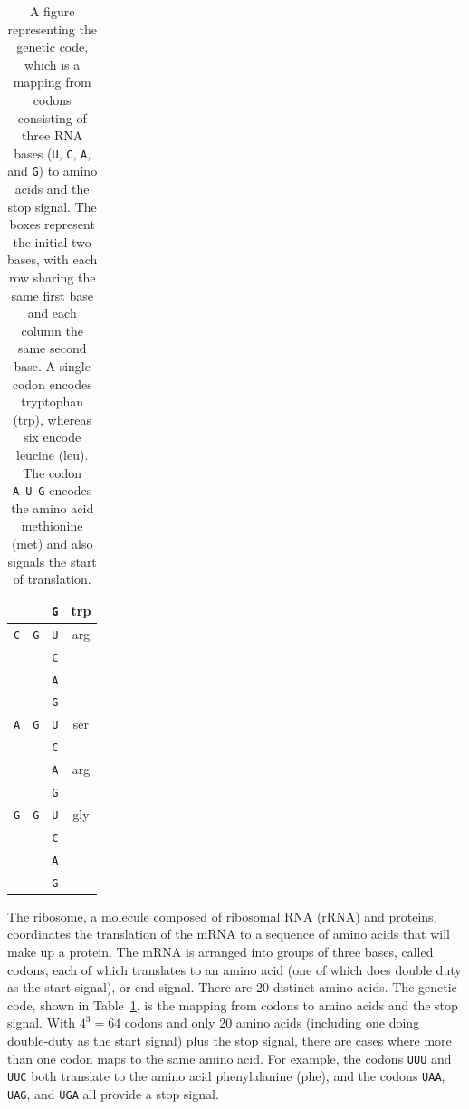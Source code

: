 \documentclass[11pt]{report}
\newcommand{\mybase}[1]{\texttt{#1}\xspace}
\newcommand{\baseA}{\mybase{A}}
\newcommand{\baseC}{\mybase{C}}
\newcommand{\baseG}{\mybase{G}}
\newcommand{\baseU}{\mybase{U}}
\newcommand{\mycaption}[2]{\caption{#2}\label{#1}}
\begin{document}
\begin{table}[t!]
\begin{tabular}{|ccc|c|}
    \\ \hline
    &  & \baseG & trp
    \\ \hline \hline
    \baseC & \baseG & \baseU & arg
    \\ & & \baseC &
    \\ & & \baseA &
    \\ & & \baseG &
    \\ \hline \hline
    \baseA & \baseG & \baseU & ser
    \\ & & \baseC &
    \\ \hline
    &  & \baseA & arg
    \\ & & \baseG &
    \\ \hline \hline
    \baseG & \baseG & \baseU & gly
    \\ & & \baseC &
    \\ & & \baseA &
    \\ & & \baseG &
    \\ \hline
  \end{tabular}
  \mycaption{tab:genetic-code}{A figure representing the genetic code,
    which is a mapping from codons consisting of three RNA bases
    (\baseU, \baseC, \baseA, and \baseG) to amino acids and the stop
    signal. The boxes represent the initial two bases, with each row
    sharing the same first base and each column the same second base.
    A single codon encodes tryptophan (trp), whereas six encode
    leucine (leu). The codon \baseA~\baseU~\baseG encodes the amino
    acid methionine (met) and also signals the start of translation. }
\end{table}
%
The ribosome, a molecule composed of ribosomal RNA (rRNA) and
proteins, coordinates the translation of the mRNA to a sequence of
amino acids that will make up a protein. The mRNA is arranged into
groups of three bases, called codons, each of which translates to an
amino acid (one of which does double duty as the start signal), or end
signal. There are 20 distinct amino acids. The genetic code, shown in
Table~\ref{tab:genetic-code}, is the mapping from codons to amino
acids and the stop signal. With $4^3 = 64$ codons and only 20 amino
acids (including one doing double-duty as the start signal) plus the
stop signal, there are cases where more than one codon maps to the
same amino acid. For example, the codons \baseU{}\baseU{}\baseU and
\baseU{}\baseU{}\baseC both translate to the amino acid phenylalanine
(phe), and the codons \baseU{}\baseA{}\baseA, \baseU{}\baseA{}\baseG,
and \baseU{}\baseG{}\baseA all provide a stop signal.
\end{document}
